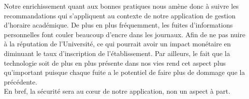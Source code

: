 		Notre enrichissement quant aux bonnes pratiques nous amène donc à suivre les recommandations qui s'appliquent au contexte de notre application de gestion d'horaire académique. De plus en plus fréquemment, les fuites d'informations personnelles font couler beaucoup d'encre dans les journaux. Afin de ne pas nuire à la réputation de l'Université, ce qui pourrait avoir un impact monétaire en diminuant le taux d'inscription de l'établissement. Par ailleurs, le fait que la technologie soit de plus en plus présente dans nos vies rend cet aspect plus qu'important puisque chaque fuite a le potentiel de faire plus de dommage que la précédente. \\
		
		En bref, la sécurité sera au c\oe ur de notre application, non un aspect à part. 
		
		
	
	
	
	
	
	